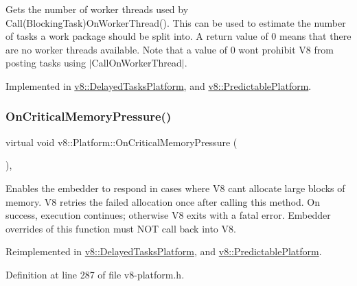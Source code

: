 Gets the number of worker threads used by Call(\+Blocking\+Task)On\+Worker\+Thread(). This can be used to estimate the number of tasks a work package should be split into. A return value of 0 means that there are no worker threads available. Note that a value of 0 won\textquotesingle{}t prohibit V8 from posting tasks using $\vert$\+Call\+On\+Worker\+Thread$\vert$. 

Implemented in \mbox{\hyperlink{classv8_1_1DelayedTasksPlatform_a1a3aa3e67db9adaac185eeac940e6a97}{v8\+::\+Delayed\+Tasks\+Platform}}, and \mbox{\hyperlink{classv8_1_1PredictablePlatform_abe8bf7e862a8403649bb3548ceab61ff}{v8\+::\+Predictable\+Platform}}.

\mbox{\label{classv8_1_1Platform_a7ed41bddc1d1ebe51c55539198d0026e}} 
\subsubsection{\texorpdfstring{On\+Critical\+Memory\+Pressure()}{OnCriticalMemoryPressure()}\hspace{0.1cm}{\footnotesize\ttfamily [1/2]}}
{\footnotesize\ttfamily virtual void v8\+::\+Platform\+::\+On\+Critical\+Memory\+Pressure (\begin{DoxyParamCaption}{ }\end{DoxyParamCaption})\hspace{0.3cm}{\ttfamily [inline]}, {\ttfamily [virtual]}}

Enables the embedder to respond in cases where V8 can\textquotesingle{}t allocate large blocks of memory. V8 retries the failed allocation once after calling this method. On success, execution continues; otherwise V8 exits with a fatal error. Embedder overrides of this function must N\+OT call back into V8. 

Reimplemented in \mbox{\hyperlink{classv8_1_1DelayedTasksPlatform_a3f545fedfc3298d49a02b4b9f4aa500c}{v8\+::\+Delayed\+Tasks\+Platform}}, and \mbox{\hyperlink{classv8_1_1PredictablePlatform_abeea60c323e795787753638133ff525e}{v8\+::\+Predictable\+Platform}}.



Definition at line 287 of file v8-\/platform.\+h.

\mbox{\label{classv8_1_1Platform_a0de4b8a7bb8865ce65beb5afbaabe4cc}} 
